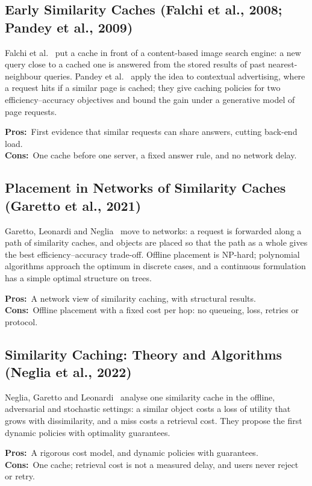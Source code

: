 \documentclass[11pt,a4paper]{article}
\newcommand{\pros}{\textcolor{green!50!black}{\textbf{Pros:}}~}
\newcommand{\cons}{\textcolor{red!70!black}{\textbf{Cons:}}~}
\begin{document}
\subsection{Early Similarity Caches (Falchi et al., 2008; Pandey et al., 2009)}
Falchi et al.~\cite{falchi2008metric} put a cache in front of a content-based image search engine:
a new query close to a cached one is answered from the stored results of past nearest-neighbour
queries. Pandey et al.~\cite{pandey2009nn} apply the idea to contextual advertising, where a
request hits if a similar page is cached; they give caching policies for two efficiency--accuracy
objectives and bound the gain under a generative model of page requests.

\pros First evidence that similar requests can share answers, cutting back-end load.\\
\cons One cache before one server, a fixed answer rule, and no network delay.

\subsection{Placement in Networks of Similarity Caches (Garetto et al., 2021)}
Garetto, Leonardi and Neglia~\cite{garetto2021placement} move to networks: a request is forwarded
along a path of similarity caches, and objects are placed so that the path as a whole gives the best
efficiency--accuracy trade-off. Offline placement is NP-hard; polynomial algorithms approach the
optimum in discrete cases, and a continuous formulation has a simple optimal structure on trees.

\pros A network view of similarity caching, with structural results.\\
\cons Offline placement with a fixed cost per hop: no queueing, loss, retries or protocol.

\subsection{Similarity Caching: Theory and Algorithms (Neglia et al., 2022)}
Neglia, Garetto and Leonardi~\cite{neglia2022similarity} analyse one similarity cache in the
offline, adversarial and stochastic settings: a similar object costs a loss of utility that grows
with dissimilarity, and a miss costs a retrieval cost. They propose the first dynamic policies with
optimality guarantees.

\pros A rigorous cost model, and dynamic policies with guarantees.\\
\cons One cache; retrieval cost is not a measured delay, and users never reject or retry.
\end{document}
